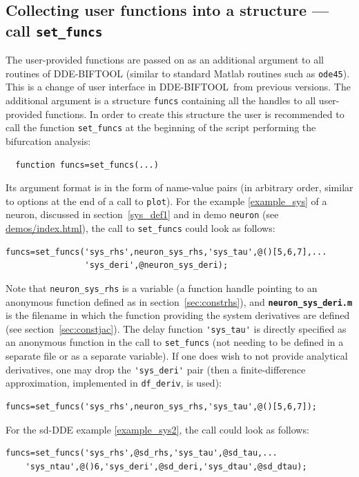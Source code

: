\documentclass[10pt]{scrartcl}
\newcommand{\DDEBIFCODE}{\textsc{DDE-BIFTOOL}}
\newcommand{\file}[1]{\textbf{\texttt{#1}}}
\newcommand{\demobase}{\url{demos/index.html}}
\newcommand{\blist}[1]{\mbox{\lstinline!#1!}}
\begin{document}
\subsection{Collecting user functions into a structure --- call
  \blist{set_funcs}}
\label{sec:funcs}
The user-provided functions are passed on as an additional argument to
all routines of \DDEBIFCODE{} (similar to standard Matlab routines
such as \blist{ode45}). This is a change of user interface in
\DDEBIFCODE{}\,\version{} from previous versions. The additional
argument is a structure \blist{funcs} containing all the handles to
all user-provided functions. In order to create this structure the
user is recommended to call the function \blist{set_funcs} at the
beginning of the script performing the bifurcation analysis:
\begin{lstlisting}
  function funcs=set_funcs(...)
\end{lstlisting}
Its argument format is in the form of name-value pairs (in arbitrary
order, similar to options at the end of a call to \blist{plot}). For
the example \eqref{example_sys} of a neuron, discussed in
section~\ref{sys_def1} and in demo \texttt{neuron} (see
\demobase{}), the call to \blist{set_funcs} could look as
follows:
\begin{lstlisting}
funcs=set_funcs('sys_rhs',neuron_sys_rhs,'sys_tau',@()[5,6,7],...
                'sys_deri',@neuron_sys_deri);
\end{lstlisting}
Note that \blist{neuron_sys_rhs} is a variable (a function handle
pointing to an anonymous function defined as in
section~\ref{sec:constrhs}), and \file{neuron\_sys\_deri.m} is the
filename in which the function providing the system derivatives are
defined (see section~\ref{sec:constjac}). The delay function
\blist{'sys_tau'} is directly specified as an anonymous function in
the call to \blist{set_funcs} (not needing to be defined in a separate
file or as a separate variable). If one does wish to not provide
analytical derivatives, one may drop the \blist{'sys_deri'} pair (then
a finite-difference approximation, implemented in \blist{df_deriv}, is
used):
\begin{lstlisting}
funcs=set_funcs('sys_rhs',neuron_sys_rhs,'sys_tau',@()[5,6,7]);
\end{lstlisting}
For the sd-DDE example \eqref{example_sys2}, the call could look as follows:
\begin{lstlisting}
funcs=set_funcs('sys_rhs',@sd_rhs,'sys_tau',@sd_tau,...
    'sys_ntau',@()6,'sys_deri',@sd_deri,'sys_dtau',@sd_dtau);  
\end{lstlisting}
\end{document}
